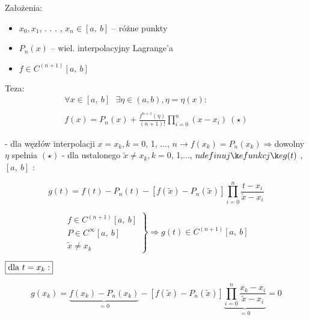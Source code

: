  \begin{frame}

Założenia:

\begin{itemize}
\item $x_{0}, x_{1}$, . . . , $x_{n}\in[a,\ b]$ -- różne punkty
\item $P_{n}(x)$ -- wiel. interpolacyjny Lagrange'a
\item $f\in C^{(n+1)}[a,\ b]$
\end{itemize}

\begin{block}
{Teza:}
\begin{gather*}
  \forall x \in[a,\ b] \text{ } \exists \eta \in (a, b), \eta = \eta(x): \\ \\
  f(x)=P_{n}(x)+\frac{f^{n+1}(\eta)}{(n+1)!}\prod_{i=0}^{n}(x-x_{i})\ (\star)
\end{gather*}
\end{block}

\end{frame}

\begin{frame}

- dla węzłów interpolacji $x=x_{k}, k=0$, 1, ..., $n \rightarrow f(x_{k})=P_{n}(x_{k})\Rightarrow $dowolny $\eta$ spelnia $(\star)$ \newline
- dla ustalonego $\tilde{x}\neq x_{k}, k=0$, 1,..., $n\\
definuję funkcję g(t)$ , $[a,\ b]$ :

$$g(t)=f(t)-P_{n}(t)-[f(\tilde{x})-P_{n}(\tilde{x})]\prod_{i=0}^{n}\frac{t-x_{i}}{\tilde{x}-x_{i}}$$

$$
 \left. \begin{array}{ll}
f\in C^{(n+1)}[a,\ b] \\
P\in C^{\infty}[a,\ b]\\
\tilde{x}\neq x_{k}
\end{array} \right \} \Rightarrow g(t)\in C^{(n+1)}[a,\ b]
$$

$\fbox{dla $t=x_{k}:$}$

$$g(x_{k})=\underbrace{f(x_{k})-P_{n}(x_{k})}_{=0}-[f(\tilde{x})-P_{n}(\tilde{x})]\underbrace{\prod_{i=0}^{n}\frac{x_{k}-x_{i}}{\tilde{x}-x_{i}}}_{=0}=0$$

\end{frame}

